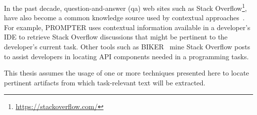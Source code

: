 In the past decade, question-and-answer (\acs{qa}) web sites such as Stack Overflow\footnote{\url{https://stackoverflow.com/}}, have also
become a common knowledge source used by contextual approaches~\cite{Ponzanelli2013b, Ponzanelli2014b, Treude2016, delfim2016}.
For example, {\small PROMPTER} uses contextual information 
available in a developer's IDE to retrieve Stack Overflow discussions that might be pertinent 
to the developer's current task. Other tools such as {\small BIKER}~\cite{Huang2018} mine Stack Overflow posts to assist developers in locating API components needed in a programming tasks. 





This thesis assumes the usage of one or more techniques presented here to locate pertinent
artifacts from which task-relevant text will be extracted.



